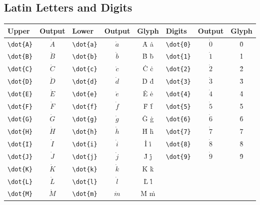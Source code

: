 \documentclass[12pt,a4paper]{article}
\begin{document}
\subsection*{Latin Letters and Digits}
\begin{longtable}{|l|c|l|c|c|l|c|c|}
\hline
\textbf{Upper} & \textbf{Output} & \textbf{Lower} & \textbf{Output} & \textbf{Glyph} & \textbf{Digits} & \textbf{Output} & \textbf{Glyph} \\
\hline
\verb|\dot{A}| & $\dot{A}$       & \verb|\dot{a}| & $\dot{a}$       & Ȧ ȧ            & \verb|\dot{0}|  & $\dot{0}$       & 0̇ \\
\verb|\dot{B}| & $\dot{B}$       & \verb|\dot{b}| & $\dot{b}$       & Ḃ ḃ            & \verb|\dot{1}|  & $\dot{1}$       & 1̇ \\
\verb|\dot{C}| & $\dot{C}$       & \verb|\dot{c}| & $\dot{c}$       & Ċ ċ            & \verb|\dot{2}|  & $\dot{2}$       & 2̇ \\
\verb|\dot{D}| & $\dot{D}$       & \verb|\dot{d}| & $\dot{d}$       & Ḋ ḋ            & \verb|\dot{3}|  & $\dot{3}$       & 3̇ \\
\verb|\dot{E}| & $\dot{E}$       & \verb|\dot{e}| & $\dot{e}$       & Ė ė            & \verb|\dot{4}|  & $\dot{4}$       & 4̇ \\
\verb|\dot{F}| & $\dot{F}$       & \verb|\dot{f}| & $\dot{f}$       & Ḟ ḟ            & \verb|\dot{5}|  & $\dot{5}$       & 5̇ \\
\verb|\dot{G}| & $\dot{G}$       & \verb|\dot{g}| & $\dot{g}$       & Ġ ġ            & \verb|\dot{6}|  & $\dot{6}$       & 6̇ \\
\verb|\dot{H}| & $\dot{H}$       & \verb|\dot{h}| & $\dot{h}$       & Ḣ ḣ            & \verb|\dot{7}|  & $\dot{7}$       & 7̇ \\
\verb|\dot{I}| & $\dot{I}$       & \verb|\dot{i}| & $\dot{i}$       & İ i̇            & \verb|\dot{8}|  & $\dot{8}$       & 8̇ \\
\verb|\dot{J}| & $\dot{J}$       & \verb|\dot{j}| & $\dot{j}$       & J̇ j̇            & \verb|\dot{9}|  & $\dot{9}$       & 9̇ \\
\verb|\dot{K}| & $\dot{K}$       & \verb|\dot{k}| & $\dot{k}$       & K̇ k̇            &                 &                 & \\
\verb|\dot{L}| & $\dot{L}$       & \verb|\dot{l}| & $\dot{l}$       & L̇ l̇            &                 &                 & \\
\verb|\dot{M}| & $\dot{M}$       & \verb|\dot{m}| & $\dot{m}$       & Ṁ ṁ            &                 &                 & \\

\end{longtable}
\end{document}
